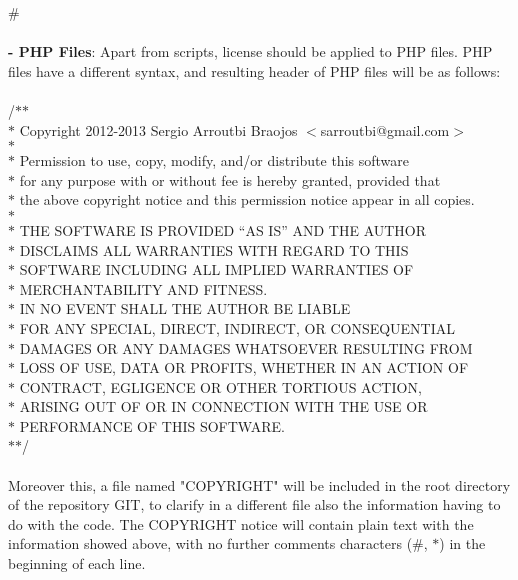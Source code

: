 \documentclass[11pt]{article}
\begin{document}
\#\\
\\
\textbf{- PHP Files}: Apart from scripts, license should be applied to PHP files. PHP files have a different syntax, and resulting header of PHP files will be as follows:\\
\\
/$*$$*$\\
$*$ Copyright 2012-2013 Sergio Arroutbi Braojos $<$sarroutbi@gmail.com$>$\\
$*$ \\
$*$ Permission to use, copy, modify, and/or distribute this software \\
$*$ for any purpose with or without fee is hereby granted, provided that \\
$*$ the above copyright notice and this permission notice appear in all copies.\\
$*$ \\
$*$ THE SOFTWARE IS PROVIDED “AS IS” AND THE AUTHOR \\
$*$ DISCLAIMS ALL WARRANTIES  WITH REGARD TO THIS \\
$*$ SOFTWARE INCLUDING ALL IMPLIED WARRANTIES OF \\
$*$ MERCHANTABILITY AND FITNESS. \\
$*$ IN NO EVENT SHALL THE AUTHOR BE LIABLE \\
$*$ FOR ANY SPECIAL, DIRECT, INDIRECT, OR CONSEQUENTIAL \\
$*$ DAMAGES OR ANY DAMAGES WHATSOEVER RESULTING FROM \\
$*$ LOSS OF USE, DATA OR PROFITS, WHETHER IN AN ACTION OF \\  
$*$ CONTRACT, EGLIGENCE OR OTHER TORTIOUS ACTION, \\ 
$*$ ARISING OUT OF OR IN CONNECTION WITH THE USE OR \\
$*$ PERFORMANCE OF THIS SOFTWARE.\\
$*$$*$/
\\
\\
Moreover this, a file named "COPYRIGHT" will be included in the root directory of the repository GIT, to clarify in a different file also the information having to do with the code. The COPYRIGHT notice will contain plain text with the information showed above, with no further comments characters (\#, $*$) in the beginning of each line.\\
\end{document}
